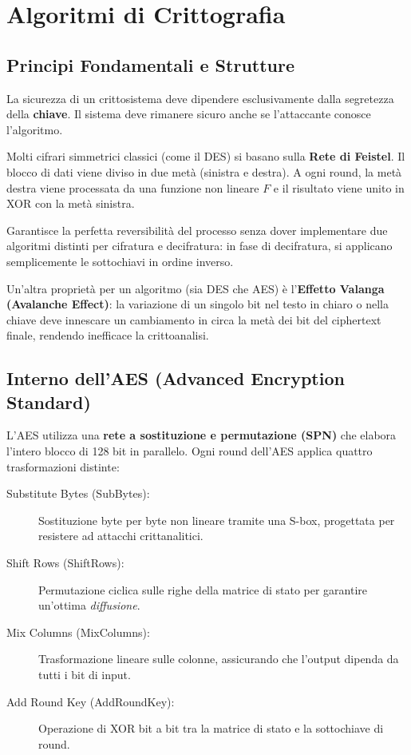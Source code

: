 \chapter{Algoritmi di Crittografia}
\section{Principi Fondamentali e Strutture}

\begin{defbox}
La sicurezza di un crittosistema deve dipendere esclusivamente dalla segretezza della \textbf{chiave}. Il sistema deve rimanere sicuro anche se l'attaccante conosce l'algoritmo.
\end{defbox}

Molti cifrari simmetrici classici (come il DES) si basano sulla \textbf{Rete di Feistel}. Il blocco di dati viene diviso in due metà (sinistra e destra). A ogni round, la metà destra viene processata da una funzione non lineare $F$ e il risultato viene unito in XOR con la metà sinistra. 

\begin{notebox}
Garantisce la perfetta reversibilità del processo senza dover implementare due algoritmi distinti per cifratura e decifratura: in fase di decifratura, si applicano semplicemente le sottochiavi in ordine inverso.
\end{notebox}

Un'altra proprietà per un algoritmo (sia DES che AES) è l'\textbf{Effetto Valanga (Avalanche Effect)}: la variazione di un singolo bit nel testo in chiaro o nella chiave deve innescare un cambiamento in circa la metà dei bit del ciphertext finale, rendendo inefficace la crittoanalisi.

\section{Interno dell'AES (Advanced Encryption Standard)}
L'AES utilizza una \textbf{rete a sostituzione e permutazione (SPN)} che elabora l'intero blocco di 128 bit in parallelo. Ogni round dell'AES applica quattro trasformazioni distinte:
\begin{description}
    \item[Substitute Bytes (SubBytes):] Sostituzione byte per byte non lineare tramite una S-box, progettata per resistere ad attacchi crittanalitici.
    \item[Shift Rows (ShiftRows):] Permutazione ciclica sulle righe della matrice di stato per garantire un'ottima \textit{diffusione}.
    \item[Mix Columns (MixColumns):] Trasformazione lineare sulle colonne, assicurando che l'output dipenda da tutti i bit di input.
    \item[Add Round Key (AddRoundKey):] Operazione di XOR bit a bit tra la matrice di stato e la sottochiave di round.
\end{description}

